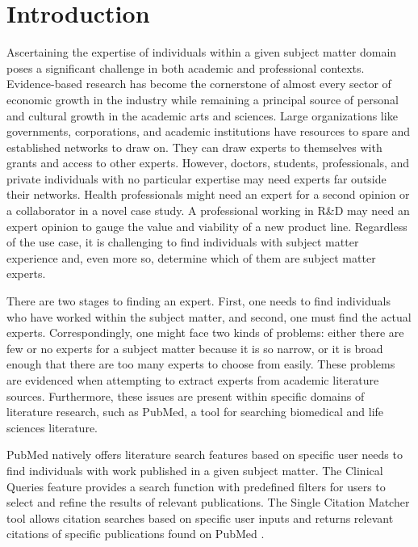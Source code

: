 \section{Introduction}

Ascertaining the expertise of individuals within a given subject matter domain poses a significant challenge in both academic and professional contexts. Evidence-based research has become the cornerstone of almost every sector of economic growth in the industry while remaining a principal source of personal and cultural growth in the academic arts and sciences. Large organizations like governments, corporations, and academic institutions have resources to spare and established networks to draw on. They can draw experts to themselves with grants and access to other experts. However, doctors, students, professionals, and private individuals with no particular expertise may need experts far outside their networks. Health professionals might need an expert for a second opinion or a collaborator in a novel case study. A professional working in R\&D may need an expert opinion to gauge the value and viability of a new product line. Regardless of the use case, it is challenging to find individuals with subject matter experience and, even more so, determine which of them are subject matter experts. 

There are two stages to finding an expert. First, one needs to find individuals who have worked within the subject matter, and second, one must find the actual experts. Correspondingly, one might face two kinds of problems: either there are few or no experts for a subject matter because it is so narrow, or it is broad enough that there are too many experts to choose from easily. These problems are evidenced when attempting to extract experts from academic literature sources. Furthermore, these issues are present within specific domains of literature research, such as PubMed, a tool for searching biomedical and life sciences literature. 

PubMed natively offers literature search features based on specific user needs to find individuals with work published in a given subject matter. The Clinical Queries feature provides a search function with predefined filters for users to select and refine the results of relevant publications. The Single Citation Matcher tool allows citation searches based on specific user inputs and returns relevant citations of specific publications found on PubMed \cite{ref-pubmed-native}. 

